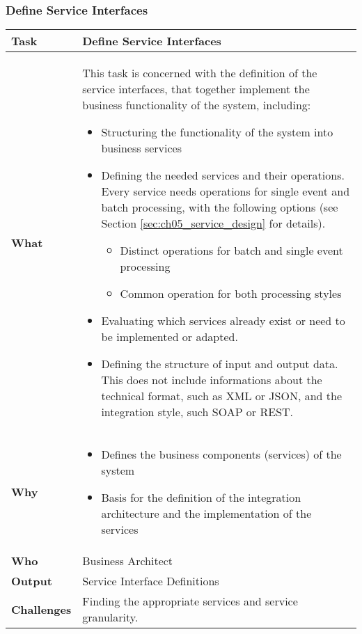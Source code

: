 \subsubsection{Define Service Interfaces}
\begin{tabularx}{\textwidth}{@{} l X @{}}
	\caption{Define Service Interfaces} \label{table:ch6_Task_Define_Service_Interfaces}\\
	\toprule
	\bfseries Task & Define Service Interfaces\\
	\midrule\bfseries What & 
	This task is concerned with the definition of the service interfaces, that together implement the business functionality of the system, including:
	\begin{itemize}
		\item Structuring the functionality of the system into business services
		\item Defining the needed services and their operations. Every service needs operations for single event and batch processing, with the following options (see Section \ref{sec:ch05_service_design} for details).
		\begin{itemize}
			\item Distinct operations for batch and single event processing
			\item Common operation for both processing styles
		\end{itemize}
		\item Evaluating which services already exist or need to be implemented or adapted.
		\item Defining the structure of input and output data. This does not include informations about the technical format, such as \ac{XML} or \ac{JSON}, and the integration style, such SOAP or \ac{REST}.
	\end{itemize}
	\\
	\midrule
	\bfseries Why &
	\begin{itemize}
		\item Defines the business components (services) of the system
		\item Basis for the definition of the integration architecture and the implementation of the services
	\end{itemize}\\
	\midrule
	\bfseries Who & Business Architect\\
	\midrule
	\bfseries Output & Service Interface Definitions\\
	\midrule
	\bfseries Challenges & Finding the appropriate services and service granularity.\\
	\bottomrule
\end{tabularx}


